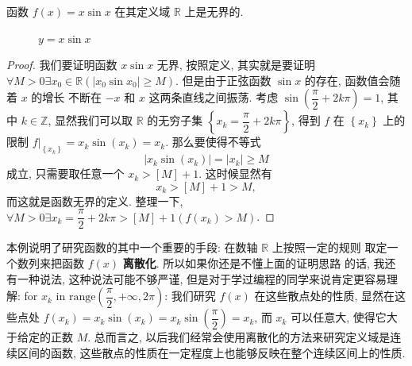 \documentclass[10pt,UTF8]{book} %
\begin{document}
\begin{example}
    函数 $f(x) = x \sin x$ 在其定义域 $\mathbb{R}$ 上是无界的.
    \begin{figure}[H]
        \centering
        \caption{$y = x \sin x$}
    \end{figure}
    \begin{proof}
        我们要证明函数 $x \sin x$ 无界, 按照定义, 其实就是要证明
        $\forall M>0 \exists x_0 \in \mathbb{R} \left(
            |x_0\sin x_0| \geqslant M
        \right)$. 但是由于正弦函数 $\sin x$ 的存在, 函数值会随着 $x$ 的增长
        不断在 $-x$ 和 $x$ 这两条直线之间振荡. 考虑 
        $\sin \left( \dfrac{\pi}{2} + 2k\pi \right) = 1$, 
        其中 $k \in \mathbb{Z}$, 显然我们可以取 $\mathbb{R}$ 的无穷子集
        $\left\{ x_k = \dfrac{\pi}{2} + 2k\pi \right\}$, 
        得到 $f$ 在 $\left\{ x_k \right\}$ 上的限制 $f|_{\left\{x_k\right\}} =
        x_k \sin(x_k) = x_k$.
        那么要使得不等式
        \[ \left| x_k \sin (x_k) \right| = \left| x_k \right| \geqslant M \]
        成立, 只需要取任意一个 $x_k > [M]+1$. 这时候显然有
        \[ x_k > [M]+1 > M, \]
        而这就是函数无界的定义. 整理一下, $\forall M > 0 \exists
        x_k = \dfrac{\pi}{2} + 2k\pi > [M]+1 \left(
            f(x_k) > M
        \right)$.
    \end{proof}
    \begin{remark}
        本例说明了研究函数的其中一个重要的手段: 在数轴 $\mathbb{R}$ 上按照一定的规则
        取定一个数列来把函数 $f(x)$ \textbf{离散化}. 所以如果你还是不懂上面的证明思路
        的话, 我还有一种说法, 这种说法可能不够严谨, 但是对于学过编程的同学来说肯定更容易理解:
        \newline for $x_k$ in $\mathrm{range}\left( \dfrac{\pi}{2}, +\infty, 2\pi \right)$:
        \newline \indent 我们研究 $f(x)$ 在这些散点处的性质, 
        \newline \indent 显然在这些点处 $f(x_k) = x_k \sin(x_k) = x_k \sin \left( \dfrac{\pi}{2} \right) = x_k$,
        \newline \indent 而 $x_k$ 可以任意大, 使得它大于给定的正数 $M$.
        \newline 总而言之, 以后我们经常会使用离散化的方法来研究定义域是连续区间的函数,
        这些散点的性质在一定程度上也能够反映在整个连续区间上的性质.
    \end{remark}
\end{example}
\end{document}
